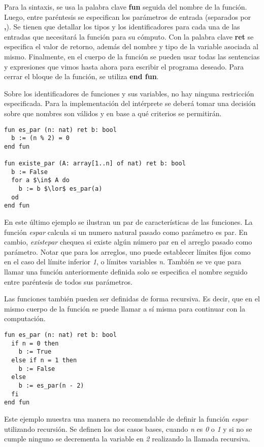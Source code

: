 \documentclass{article}
\begin{document}
Para la sintaxis, se usa la palabra clave \textbf{fun} seguida del nombre de la función.
Luego, entre paréntesis se especifican los parámetros de entrada (separados por \textbf{,}).
Se tienen que detallar los tipos y los identificadores para cada una de las entradas que necesitará la función para su cómputo.
Con la palabra clave \textbf{ret} se especifica el valor de retorno, además del nombre y tipo de la variable asociada al mismo.
Finalmente, en el cuerpo de la función se pueden usar todas las sentencias y expresiones que vimos hasta ahora para escribir el programa deseado.
Para cerrar el bloque de la función, se utiliza \textbf{end fun}.

Sobre los identificadores de funciones y sus variables, no hay ninguna restricción especificada.
Para la implementación del intérprete se deberá tomar una decisión sobre que nombres son válidos y en base a qué criterios se permitirán.

\begin{lstlisting}
fun es_par (n: nat) ret b: bool
  b := (n % 2) = 0
end fun

fun existe_par (A: array[1..n] of nat) ret b: bool
  b := False
  for a $\in$ A do
    b := b $\lor$ es_par(a)
  od
end fun
\end{lstlisting}

En este último ejemplo se ilustran un par de características de las funciones.
La función \textit{es\gbajo par} calcula si un numero natural pasado como parámetro es par.
En cambio, \textit{existe\gbajo par} chequea si existe algún número par en el arreglo pasado como parámetro.
Notar que para los arreglos, uno puede establecer límites fijos como en el caso del límite inferior \textit{1}, o límites variables \textit{n}.
También se ve que para llamar una función anteriormente definida solo se especifica el nombre seguido entre paréntesis de todos sus parámetros.

Las funciones también pueden ser definidas de forma recursiva.
Es decir, que en el mismo cuerpo de la función se puede llamar a sí misma para continuar con la computación.

\begin{lstlisting}
fun es_par (n: nat) ret b: bool
  if n = 0 then
    b := True
  else if n = 1 then
    b := False
  else
    b := es_par(n - 2)
  fi
end fun
\end{lstlisting}

Este ejemplo muestra una manera no recomendable de definir la función \textit{es\gbajo par} utilizando recursión.
Se definen los dos casos bases, cuando \textit{n} es \textit{0} o \textit{1} y si no se cumple ninguno se decrementa la variable en \textit{2} realizando la llamada recursiva.
\end{document}
